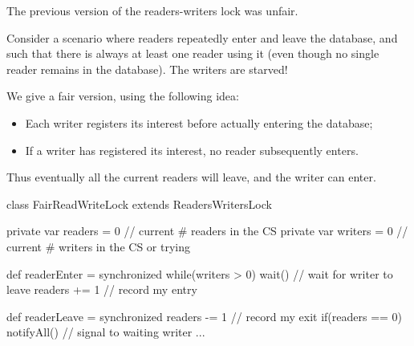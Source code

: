 \begin{slide}

The previous version of the readers-writers lock was unfair.  

Consider a scenario where readers repeatedly enter and leave the database, and
such that there is always at least one reader using it (even though no single
reader remains in the database).  The writers are starved!
\begin{center}
\end{center}
\end{slide}


\begin{slide}

We give a fair version, using the following idea:
%
\begin{itemize}
\item Each writer registers its interest before actually entering the
database;

\item If a writer has registered its interest, no reader subsequently enters.
\end{itemize}
%
Thus eventually all the current readers will leave, and the writer can enter. 
\end{slide}


\begin{slide}

\begin{scala}
class FairReadWriteLock extends ReadersWritersLock{
  private var readers = 0 // current # readers in the CS
  private var writers = 0 // current # writers in the CS or trying

  def readerEnter = synchronized{
    while(writers > 0) wait() // wait for writer to leave
    readers += 1 // record my entry
  }

  def readerLeave = synchronized{
    readers -= 1 // record my exit
    if(readers == 0) notifyAll() // signal to waiting writer
  }
  ...
}
\end{scala}
\end{slide}

